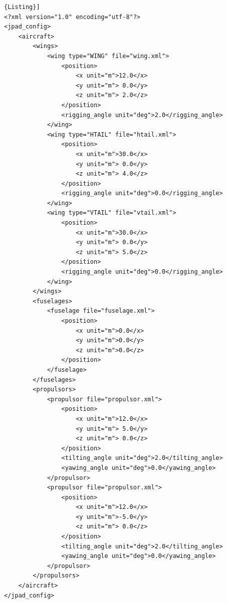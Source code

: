 \begin{lstlisting}[frame=rbl,style=MyxmlStyle, caption={{\footnotesize XML input file for an aircraft.}},label= [style=\bfseries]{Listing}]
<?xml version="1.0" encoding="utf-8"?>
<jpad_config>
    <aircraft>
        <wings>
            <wing type="WING" file="wing.xml">
                <position>
                    <x unit="m">12.0</x>
                    <y unit="m"> 0.0</y>
                    <z unit="m"> 2.0</z>
                </position>
                <rigging_angle unit="deg">2.0</rigging_angle>
            </wing>
            <wing type="HTAIL" file="htail.xml">
                <position>
                    <x unit="m">30.0</x>
                    <y unit="m"> 0.0</y>
                    <z unit="m"> 4.0</z>
                </position>
                <rigging_angle unit="deg">0.0</rigging_angle>
            </wing>
            <wing type="VTAIL" file="vtail.xml">
                <position>
                    <x unit="m">30.0</x>
                    <y unit="m"> 0.0</y>
                    <z unit="m"> 5.0</z>
                </position>
                <rigging_angle unit="deg">0.0</rigging_angle>
            </wing>
        </wings>
        <fuselages>
            <fuselage file="fuselage.xml">
                <position>
                    <x unit="m">0.0</x>
                    <y unit="m">0.0</y>
                    <z unit="m">0.0</z>
                </position>
            </fuselage>
        </fuselages>
        <propulsors>
            <propulsor file="propulsor.xml">
                <position>
                    <x unit="m">12.0</x>
                    <y unit="m"> 5.0</y>
                    <z unit="m"> 0.0</z>
                </position>
                <tilting_angle unit="deg">2.0</tilting_angle>
                <yawing_angle unit="deg">0.0</yawing_angle>
            </propulsor>
            <propulsor file="propulsor.xml">
                <position>
                    <x unit="m">12.0</x>
                    <y unit="m">-5.0</y>
                    <z unit="m"> 0.0</z>
                </position>
                <tilting_angle unit="deg">2.0</tilting_angle>
                <yawing_angle unit="deg">0.0</yawing_angle>
            </propulsor>
        </propulsors>
    </aircraft>
</jpad_config>
\end{lstlisting}

